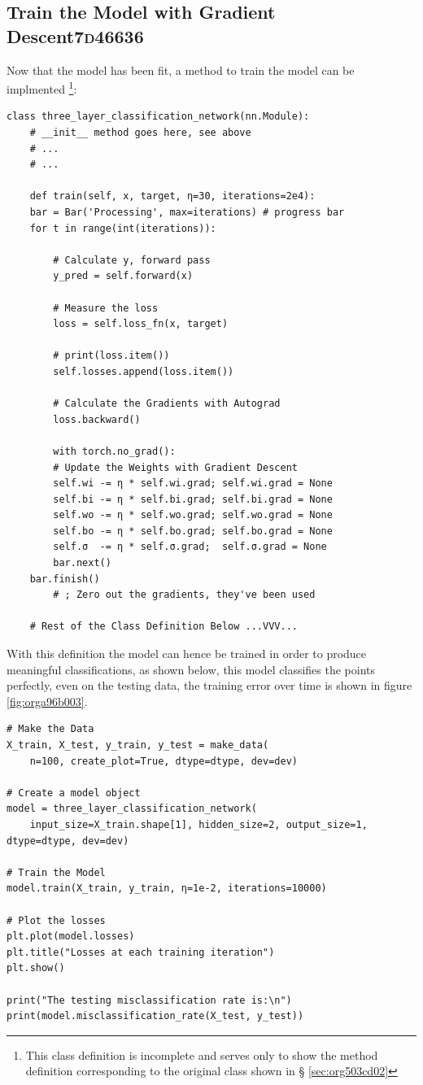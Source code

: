 \documentclass[a4paper,11pt,twoside]{article}
\begin{document}
\subsection{Train the Model with Gradient Descent\hfill{}\textsc{7d46636}}
\label{sec:org5aff863}
Now that the model has been fit, a method to train the model can be
implmented \footnote{This class definition is incomplete and serves only to show the
method definition corresponding to the original class shown in \S
\ref{sec:org503cd02}}:
\begin{verbatim}
class three_layer_classification_network(nn.Module):
    # __init__ method goes here, see above
    # ...
    # ...

    def train(self, x, target, η=30, iterations=2e4):
	bar = Bar('Processing', max=iterations) # progress bar
	for t in range(int(iterations)):

	    # Calculate y, forward pass
	    y_pred = self.forward(x)

	    # Measure the loss
	    loss = self.loss_fn(x, target)

	    # print(loss.item())
	    self.losses.append(loss.item())

	    # Calculate the Gradients with Autograd
	    loss.backward()

	    with torch.no_grad():
		# Update the Weights with Gradient Descent 
		self.wi -= η * self.wi.grad; self.wi.grad = None
		self.bi -= η * self.bi.grad; self.bi.grad = None
		self.wo -= η * self.wo.grad; self.wo.grad = None
		self.bo -= η * self.bo.grad; self.bo.grad = None
		self.σ  -= η * self.σ.grad;  self.σ.grad = None
	    bar.next()
	bar.finish()
		# ; Zero out the gradients, they've been used

    # Rest of the Class Definition Below ...VVV...
\end{verbatim}

With this definition the model can hence be trained in order to
produce meaningful classifications, as shown below, this model classifies the
points perfectly, even on the testing data, the training error 
over time is shown in figure \ref{fig:orga96b003}.

\begin{verbatim}
# Make the Data
X_train, X_test, y_train, y_test = make_data(
    n=100, create_plot=True, dtype=dtype, dev=dev)

# Create a model object
model = three_layer_classification_network(
    input_size=X_train.shape[1], hidden_size=2, output_size=1, dtype=dtype, dev=dev)

# Train the Model
model.train(X_train, y_train, η=1e-2, iterations=10000)

# Plot the losses
plt.plot(model.losses)
plt.title("Losses at each training iteration")
plt.show()

print("The testing misclassification rate is:\n")
print(model.misclassification_rate(X_test, y_test))
\end{verbatim}
\end{document}
